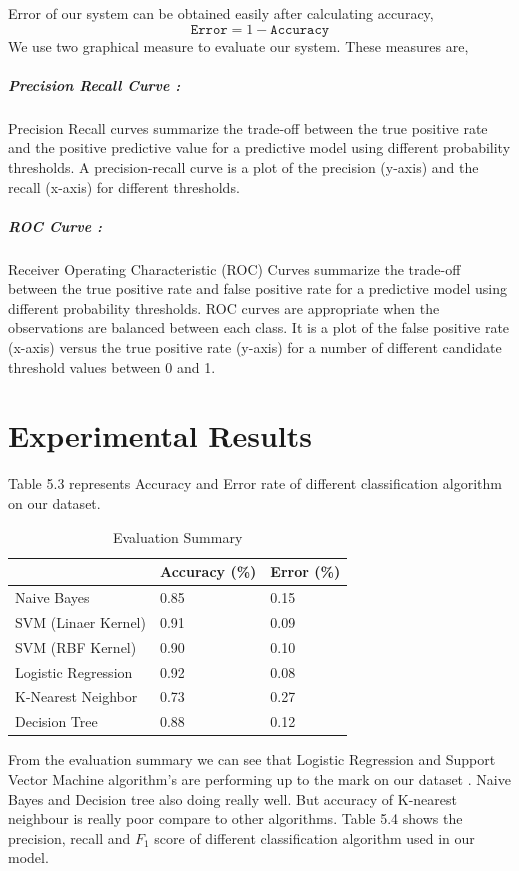 Error of our system can be obtained easily after calculating accuracy,
\begin{equation}
    \texttt{Error} = 1-\texttt{Accuracy}
\end{equation}
We use two graphical measure to evaluate our system. These measures are,
\subparagraph{Precision Recall Curve :}
Precision Recall curves summarize the trade-off between the true positive rate and the positive predictive value for a predictive model using different probability thresholds. A precision-recall curve is a plot of the precision (y-axis) and the recall (x-axis) for different thresholds.

\subparagraph{ROC Curve :}
Receiver Operating Characteristic (ROC) Curves summarize the trade-off between the true positive rate and false positive rate for a predictive model using different probability thresholds. ROC curves are appropriate when the observations are balanced between each class. It is a plot of the false positive rate (x-axis) versus the true positive rate (y-axis) for a number of different candidate threshold values between 0 and 1.

\section{Experimental Results}
Table 5.3 represents Accuracy and Error rate of different classification algorithm on our dataset.
\renewcommand{\arraystretch}{1.5}
\begin{table}[h!]
\begin{center}
\caption{Evaluation Summary}
\begin{tabular}{|m{7cm} | m{3cm}| m{3cm}|}
\hline
     & Accuracy (\%) & Error (\%) \\
\hline
    Naive Bayes & 0.85 & 0.15\\
\hline 
    SVM (Linaer Kernel) & 0.91 & 0.09\\
\hline 
    SVM (RBF Kernel) & 0.90 & 0.10\\
\hline 
    Logistic Regression & 0.92 & 0.08\\
\hline
    K-Nearest Neighbor & 0.73 & 0.27\\
\hline
    Decision Tree & 0.88 & 0.12\\
\hline
\end{tabular}
\end{center}
\end{table}
\par
\noindent
From the evaluation summary we can see that Logistic Regression and Support Vector Machine algorithm's are performing up to the mark on our dataset . Naive Bayes and Decision tree also doing really well. But accuracy of K-nearest neighbour is really poor compare to other algorithms. 
\clearpage
\noindent
Table 5.4 shows the precision, recall and $F_1$ score of different classification algorithm used in our model.

